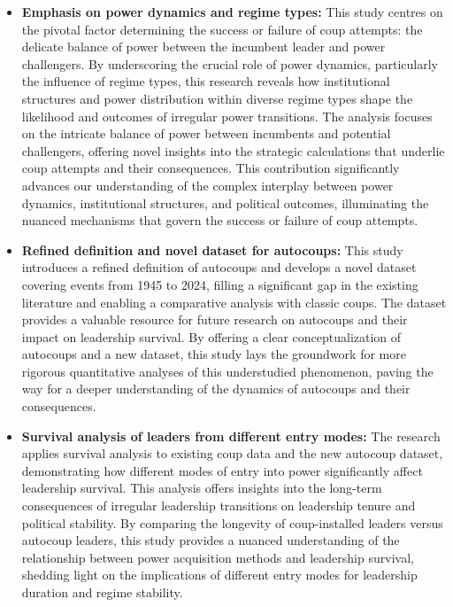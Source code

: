 \documentclass[
  12pt,
]{report}
\begin{document}
\begin{itemize}
\item
  \textbf{Emphasis on power dynamics and regime types:} This study
  centres on the pivotal factor determining the success or failure of
  coup attempts: the delicate balance of power between the incumbent
  leader and power challengers. By underscoring the crucial role of
  power dynamics, particularly the influence of regime types, this
  research reveals how institutional structures and power distribution
  within diverse regime types shape the likelihood and outcomes of
  irregular power transitions. The analysis focuses on the intricate
  balance of power between incumbents and potential challengers,
  offering novel insights into the strategic calculations that underlie
  coup attempts and their consequences. This contribution significantly
  advances our understanding of the complex interplay between power
  dynamics, institutional structures, and political outcomes,
  illuminating the nuanced mechanisms that govern the success or failure
  of coup attempts.
\item
  \textbf{Refined definition and novel dataset for autocoups:} This
  study introduces a refined definition of autocoups and develops a
  novel dataset covering events from 1945 to 2024, filling a significant
  gap in the existing literature and enabling a comparative analysis
  with classic coups. The dataset provides a valuable resource for
  future research on autocoups and their impact on leadership survival.
  By offering a clear conceptualization of autocoups and a new dataset,
  this study lays the groundwork for more rigorous quantitative analyses
  of this understudied phenomenon, paving the way for a deeper
  understanding of the dynamics of autocoups and their consequences.
\item
  \textbf{Survival analysis of leaders from different entry modes:} The
  research applies survival analysis to existing coup data and the new
  autocoup dataset, demonstrating how different modes of entry into
  power significantly affect leadership survival. This analysis offers
  insights into the long-term consequences of irregular leadership
  transitions on leadership tenure and political stability. By comparing
  the longevity of coup-installed leaders versus autocoup leaders, this
  study provides a nuanced understanding of the relationship between
  power acquisition methods and leadership survival, shedding light on
  the implications of different entry modes for leadership duration and
  regime stability.
\end{itemize}
\end{document}
